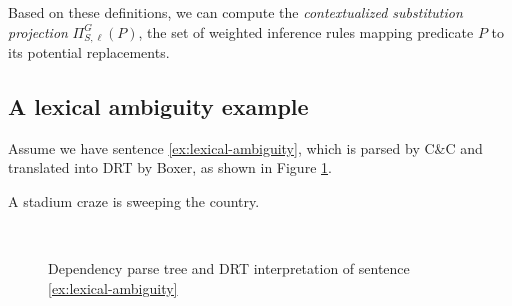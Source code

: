 Based on these definitions, we can compute the \textit{contextualized
substitution projection} $\Pi^G_{S, \ell}(P)$, the set of weighted inference
rules mapping predicate $P$ to its potential replacements.


\subsection*{A lexical ambiguity example}

Assume we have sentence \eqref{ex:lexical-ambiguity}, which is parsed by C\&C
and translated into DRT by Boxer, as shown in Figure
\ref{drs:lexical-ambiguity}.

\begin{covex}\label{ex:lexical-ambiguity}
  A stadium craze is sweeping the country.
\end{covex}

\begin{figure}
  \centering
  ~~~~~~~~
  \caption{Dependency parse tree and DRT interpretation of
  sentence \eqref{ex:lexical-ambiguity}}
  \label{drs:lexical-ambiguity}
\end{figure}

